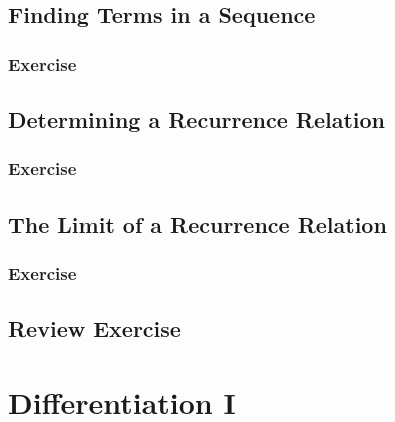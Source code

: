 \documentclass[
  11pt,
  openany]{book}
\begin{document}
\section{Finding Terms in a Sequence}\label{finding-terms-in-a-sequence}

\newpage

\subsection*{Exercise}\label{exercise-8}

\newpage

\section{Determining a Recurrence Relation}\label{determining-a-recurrence-relation}

\newpage

\subsection*{Exercise}\label{exercise-9}

\newpage

\section{The Limit of a Recurrence Relation}\label{the-limit-of-a-recurrence-relation}

\newpage

\subsection*{Exercise}\label{exercise-10}

\newpage

\section*{Review Exercise}\label{review-exercise-1}

\chapterfont{\color{white}}

\chapter{Differentiation I}\label{differentiation-i}
\end{document}
